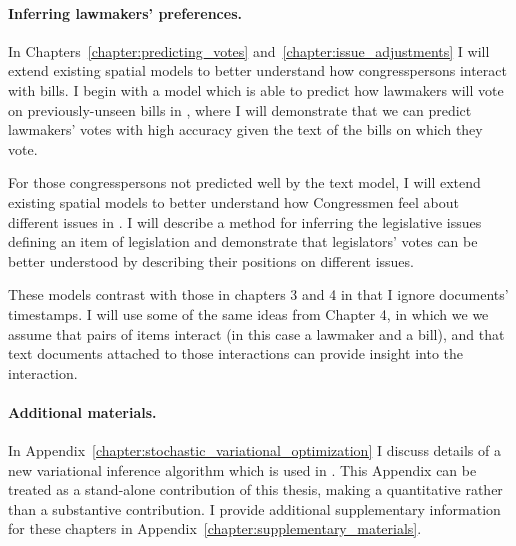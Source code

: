 
\paragraph{Inferring lawmakers' preferences.}

In Chapters~\ref{chapter:predicting_votes}
and~\ref{chapter:issue_adjustments} I will extend existing spatial
models to better understand how congresspersons interact with bills.
I begin with a model which is able to predict how lawmakers will vote
on previously-unseen bills in , where I will
demonstrate that we can predict lawmakers' votes with high accuracy
given the text of the bills on which they vote.

For those congresspersons not predicted well by the text model, I will
extend existing spatial models to better understand how Congressmen
feel about different issues in .  I will
describe a method for inferring the legislative issues defining an
item of legislation and demonstrate that legislators' votes can be
better understood by describing their positions on different issues.

These models contrast with those in chapters 3 and 4 in that I ignore
documents' timestamps.  I will use some of the same ideas from Chapter
4, in which we we assume that pairs of items interact (in this case a
lawmaker and a bill), and that text documents attached to those
interactions can provide insight into the interaction.

\paragraph{Additional materials.}
In Appendix~\ref{chapter:stochastic_variational_optimization} I
discuss details of a new variational inference algorithm which is used
in .  This Appendix can be treated as a
stand-alone contribution of this thesis, making a quantitative rather
than a substantive contribution.  I provide additional supplementary
information for these chapters in
Appendix~\ref{chapter:supplementary_materials}.
